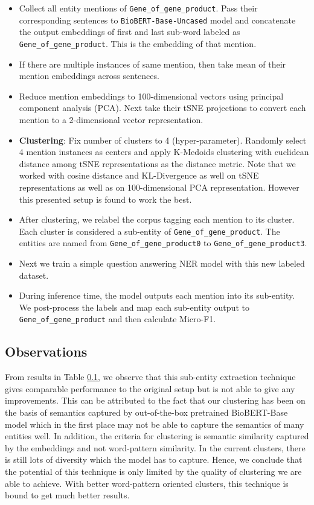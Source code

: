 \begin{itemize}
    \item Collect all entity mentions of \texttt{Gene\_of\_gene\_product}. Pass their corresponding sentences to \texttt{BioBERT-Base-Uncased} model and concatenate the output embeddings of first and last sub-word labeled as \texttt{Gene\_of\_gene\_product}. This is the embedding of that mention.
    
    \item If there are multiple instances of same mention, then take mean of their mention embeddings across sentences.
    
    \item Reduce mention embeddings to 100-dimensional vectors using principal component analysis (PCA). Next take their tSNE\cite{} projections to convert each mention to a 2-dimensional vector representation.
    
    \item \textbf{Clustering}: Fix number of clusters to 4 (hyper-parameter). Randomly select 4 mention instances as centers and apply K-Medoids clustering with euclidean distance among tSNE representations as the distance metric. Note that we worked with cosine distance and KL-Divergence as well on tSNE representations as well as on 100-dimensional PCA representation. However this presented setup is found to work the best.
    
    \item After clustering, we relabel the corpus tagging each mention to its cluster. Each cluster is considered a sub-entity of \texttt{Gene\_of\_gene\_product}. The entities are named from \texttt{Gene\_of\_gene\_product0} to \texttt{Gene\_of\_gene\_product3}.
    
    \item Next we train a simple question answering NER model with this new labeled dataset. 
    
    \item During inference time, the model outputs each mention into its sub-entity. We post-process the labels and map each sub-entity output to \texttt{Gene\_of\_gene\_product} and then calculate Micro-F1.
\end{itemize}

\subsection{Observations}
From results in Table \ref{}, we observe that this sub-entity extraction technique gives comparable performance to the original setup but is not able to give any improvements. This can be attributed to the fact that our clustering has been on the basis of semantics captured by out-of-the-box pretrained BioBERT-Base model which in the first place may not be able to capture the semantics of many entities well. In addition, the criteria for clustering is semantic similarity captured by the embeddings and not word-pattern similarity. In the current clusters, there is still lots of diversity which the model has to capture. Hence, we conclude that the potential of this technique is only limited by the quality of clustering we are able to achieve. With better word-pattern oriented clusters, this technique is bound to get much better results.

